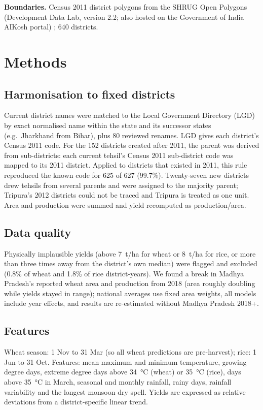 \documentclass[conference]{IEEEtran}
\begin{document}
\textbf{Boundaries.} Census 2011 district polygons from the SHRUG Open Polygons (Development Data Lab, version 2.2;
also hosted on the Government of India AIKosh portal) \cite{asher2021}; 640 districts.

\section{Methods}
\subsection{Harmonisation to fixed districts}
Current district names were matched to the Local Government Directory (LGD) by exact normalised name within the
state and its successor states (e.g.\ Jharkhand from Bihar), plus 80 reviewed renames. LGD gives each district's
Census 2011 code. For the 152 districts created after 2011, the parent was derived from sub-districts: each current
tehsil's Census 2011 sub-district code was mapped to its 2011 district. Applied to districts that existed in 2011,
this rule reproduced the known code for 625 of 627 (99.7\%). Twenty-seven new districts drew tehsils from several
parents and were assigned to the majority parent; Tripura's 2012 districts could not be traced and Tripura is treated
as one unit. Area and production were summed and yield recomputed as production/area.

\subsection{Data quality}
Physically implausible yields (above \SI{7}{t/ha} for wheat or \SI{8}{t/ha} for rice, or more than three times away
from the district's own median) were flagged and excluded (0.8\% of wheat and 1.8\% of rice district-years). We found
a break in Madhya Pradesh's reported wheat area and production from 2018 (area roughly doubling while yields stayed in
range); national averages use fixed area weights, all models include year effects, and results are re-estimated
without Madhya Pradesh 2018+.

\subsection{Features}
Wheat season: 1 Nov to 31 Mar (so all wheat predictions are pre-harvest); rice: 1 Jun to 31 Oct. Features: mean
maximum and minimum temperature, growing degree days, extreme degree days above \SI{34}{\degreeCelsius} (wheat) or
\SI{35}{\degreeCelsius} (rice), days above \SI{35}{\degreeCelsius} in March, seasonal and monthly rainfall, rainy days,
rainfall variability and the longest monsoon dry spell. Yields are expressed as relative deviations from a
district-specific linear trend.
\end{document}
